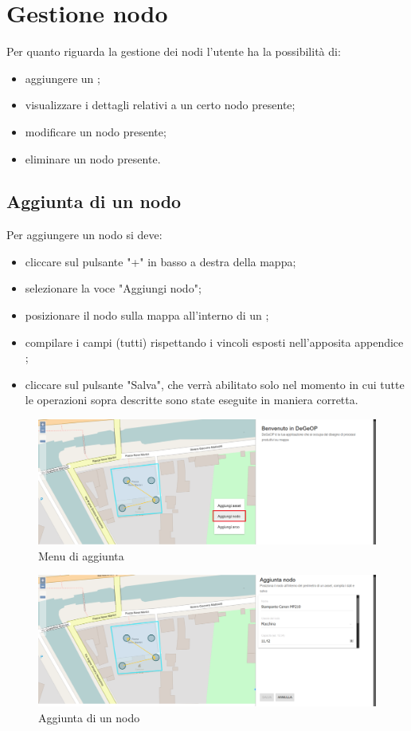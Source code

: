 \section{Gestione nodo}
Per quanto riguarda la gestione dei nodi l'utente ha la possibilità di:
\begin{itemize}
	\item aggiungere un ;
	\item visualizzare i dettagli relativi a un certo nodo presente;
	\item modificare un nodo presente;
	\item eliminare un nodo presente.
\end{itemize}

\subsection{Aggiunta di un nodo}
Per aggiungere un nodo si deve:
\begin{itemize}
	\item cliccare sul pulsante "+" in basso a destra della mappa;
	\item selezionare la voce "Aggiungi nodo";
	\item posizionare il nodo sulla mappa all'interno di un ;
	\item compilare i campi (tutti) rispettando i vincoli esposti nell'apposita appendice ;
	\item cliccare sul pulsante "Salva", che verrà abilitato solo nel momento in cui tutte le operazioni sopra descritte sono state eseguite in maniera corretta.
\end{itemize}

\begin{figure}[H]
\centering
\includegraphics[width=\textwidth]{img/menu_aperto_nodo_hover.png}
\caption{Menu di aggiunta}
\end{figure}

\begin{figure}[H]
\centering
\includegraphics[width=\textwidth]{img/aggiunta_nodo.png}
\caption{Aggiunta di un nodo}
\end{figure}

